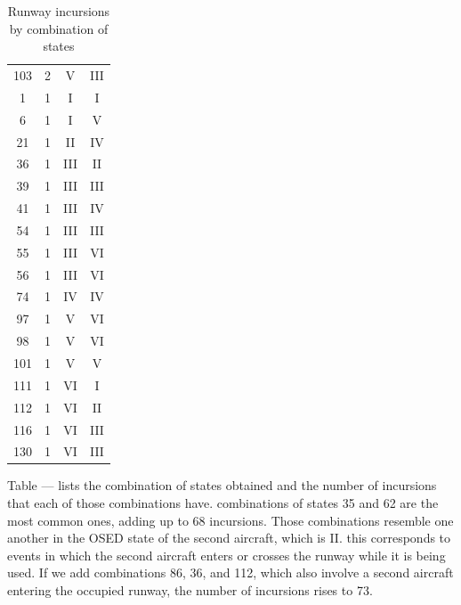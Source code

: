 \begin{table}[H]
\begin{tabular}{cccc}
103                     & 2                           & V           & III         \\
1                       & 1                           & I           & I           \\
6                       & 1                           & I           & V           \\
21                      & 1                           & II          & IV          \\
36                      & 1                           & III         & II          \\
39                      & 1                           & III         & III         \\
41                      & 1                           & III         & IV          \\
54                      & 1                           & III         & III         \\
55                      & 1                           & III         & VI          \\
56                      & 1                           & III         & VI          \\
74                      & 1                           & IV          & IV          \\
97                      & 1                           & V           & VI          \\
98                      & 1                           & V           & VI          \\
101                     & 1                           & V           & V           \\
111                     & 1                           & VI          & I           \\
112                     & 1                           & VI          & II          \\
116                     & 1                           & VI          & III         \\
130                     & 1                           & VI          & III         \end{tabular}
    \caption{Runway incursions by combination of states} 
\end{table}

Table --- lists the combination of states obtained and the number of incursions that each of those combinations have. combinations of states 35 and 62 are the most common ones, adding up to 68 incursions. 
Those combinations resemble one another in the OSED state of the second aircraft, which is II. this corresponds to events in which the second aircraft enters or crosses the runway while it is being used. If we add combinations 86, 36, and 112, which also involve a second aircraft entering the occupied runway, the number of incursions rises to 73. 


